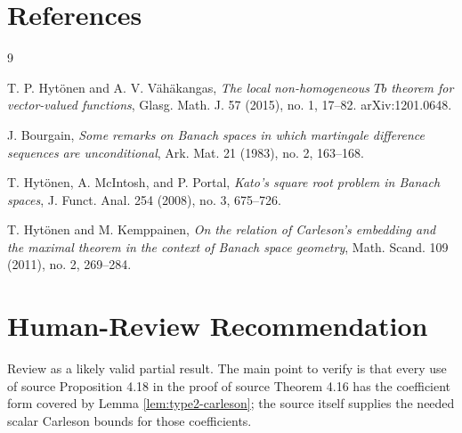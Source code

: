 \documentclass[11pt]{amsart}
\begin{document}
\section*{References}

\begin{thebibliography}{9}

T. P. Hyt\"onen and A. V. V\"ah\"akangas,
\emph{The local non-homogeneous \(Tb\) theorem for vector-valued functions},
Glasg. Math. J. 57 (2015), no. 1, 17--82.
arXiv:1201.0648.

J. Bourgain,
\emph{Some remarks on Banach spaces in which martingale difference sequences
are unconditional},
Ark. Mat. 21 (1983), no. 2, 163--168.

T. Hyt\"onen, A. McIntosh, and P. Portal,
\emph{Kato's square root problem in Banach spaces},
J. Funct. Anal. 254 (2008), no. 3, 675--726.

T. Hyt\"onen and M. Kemppainen,
\emph{On the relation of Carleson's embedding and the maximal theorem in the
context of Banach space geometry},
Math. Scand. 109 (2011), no. 2, 269--284.

\end{thebibliography}

\section*{Human-Review Recommendation}

Review as a likely valid partial result.  The main point to verify is that
every use of source Proposition 4.18 in the proof of source Theorem 4.16 has
the coefficient form covered by Lemma \ref{lem:type2-carleson}; the source
itself supplies the needed scalar Carleson bounds for those coefficients.
\end{document}
